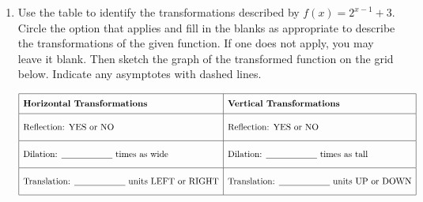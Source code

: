\documentclass[11pt]{article}
\begin{document}
\begin{enumerate}
{{ \[\begin{tikzpicture}[scale=0.39,>=triangle 45] \draw[step=1cm, black!60] (-10,-10) grid (10,10); \draw[very thick, <->] (-10.5,0) -- (10.5,0); \draw[very thick, <->] (0,-10.5) -- (0,10.5); \clip (-10.5,-10.5) rectangle (10.5,10.5);\draw[dashed, blue, very thick, <->] (-3, -10.5) -- (-3, 10.5); \draw[dashed, blue, very thick, <->] (2, -10.5) -- (2, 10.5); \draw[dashed, blue, very thick, <->] (-10.5, -1) -- (10.5, -1); \draw[blue, very thick, samples=80, domain=-10.5:-3.10000000000000, smooth] plot (\x, {-1 * (\x - (5)) * (\x - (-2)) / ((\x - (-3)) * (\x - (2)))}); \draw[blue, very thick, samples=80, domain=-2.90000000000000:1.90000000000000, smooth] plot (\x, {-1 * (\x - (5)) * (\x - (-2)) / ((\x - (-3)) * (\x - (2)))}); \draw[blue, very thick, samples=80, domain=2.10000000000000:10.5, smooth] plot (\x, {-1 * (\x - (5)) * (\x - (-2)) / ((\x - (-3)) * (\x - (2)))}); \fill[blue] (5.0, 0) circle (4pt); \fill[blue] (-2.0, 0) circle (4pt); \fill[blue] (0, -1.67) circle (4pt); \fill[blue] (-4.0, -3.0) circle (4pt); \fill[blue] (1.0, -3.0) circle (4pt); \fill[blue] (9.0, -0.52) circle (4pt); \draw[blue, very thick, fill=white] (3.0, 1.67) circle (4pt); \end{tikzpicture}\] 

}
}

\newpage

% 

\item %
\providecommand{\stxKnowl}{}\renewcommand{\stxKnowl}[1]{#1}
\providecommand{\stxOuttro}{}\renewcommand{\stxOuttro}[1]{#1}
\providecommand{\stxTitle}{}\renewcommand{\stxTitle}[1]{#1}
\renewcommand{\stxOuttro}[1]{}
\stxKnowl{
 Use the table to identify the transformations described by \(f(x) = 2^{x - 1} + 3\). Circle the option that applies and fill in the blanks as appropriate to describe the transformations of the given function. If one does not apply, you may leave it blank. Then sketch the graph of the transformed function on the grid below. Indicate any asymptotes with dashed lines. 

 \[\begin{array}{|l|l|} \hline \rule[-0.8em]{0pt}{2.2em} \textbf{Horizontal Transformations} & \textbf{Vertical Transformations} \\ \hline \rule[-1.2em]{0pt}{3em} \text{Reflection: YES or NO} & \text{Reflection: YES or NO} \\ \hline \rule[-1.2em]{0pt}{3em} \text{Dilation: \underline{\hspace{2cm}} times as wide} & \text{Dilation: \underline{\hspace{2cm}} times as tall} \\ \hline \rule[-1.2em]{0pt}{3em} \text{Translation: \underline{\hspace{2cm}} units LEFT or RIGHT} & \text{Translation: \underline{\hspace{2cm}} units UP or DOWN} \\ \hline \end{array}\] 

}
\end{enumerate}
\end{document}
